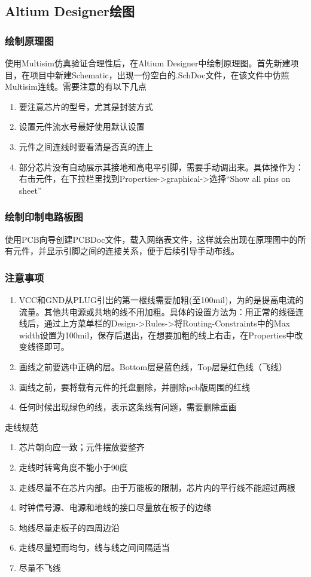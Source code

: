 \documentclass{ctexart}
\begin{document}
\subsection{Altium Designer绘图}
\subsubsection{绘制原理图}
使用Multisim仿真验证合理性后，在Altium Designer中绘制原理图。首先新建项目，在项目中新建Schematic，出现一份空白的.SchDoc文件，在该文件中仿照Multisim连线。需要注意的有以下几点
\begin{enumerate}
    \item 要注意芯片的型号，尤其是封装方式
    \item 设置元件流水号最好使用默认设置
    \item 元件之间连线时要看清是否真的连上
    \item 部分芯片没有自动展示其接地和高电平引脚，需要手动调出来。具体操作为：右击元件，在下拉栏里找到Properties->graphical->选择“Show all pins on sheet”
\end{enumerate}
\subsubsection{绘制印制电路板图}
使用PCB向导创建PCBDoc文件，载入网络表文件，这样就会出现在原理图中的所有元件，并显示引脚之间的连接关系，便于后续引导手动布线。
\subsubsection{注意事项}
\begin{enumerate}
    \item VCC和GND从PLUG引出的第一根线需要加粗(至100mil)，为的是提高电流的流量。其他共电源或共地的线不用加粗。具体的设置方法为：用正常的线径连线后，通过上方菜单栏的Design->Rules->将Routing-Constraints中的Max width设置为100mil，保存后退出，在想要加粗的线上右击，在Properties中改变线径即可。
    \item 画线之前要选中正确的层。Bottom层是蓝色线，Top层是红色线（飞线）
    \item 画线之前，要将载有元件的托盘删除，并删除pcb版周围的红线
    \item 任何时候出现绿色的线，表示这条线有问题，需要删除重画
\end{enumerate}
走线规范
\begin{enumerate}
    \item 芯片朝向应一致；元件摆放要整齐
    \item 走线时转弯角度不能小于90度
    \item 走线尽量不在芯片内部。由于万能板的限制，芯片内的平行线不能超过两根
    \item 时钟信号源、电源和地线的接口尽量放在板子的边缘
    \item 地线尽量走板子的四周边沿
    \item 走线尽量短而均匀，线与线之间间隔适当
    \item 尽量不飞线
\end{enumerate}
\end{document}
